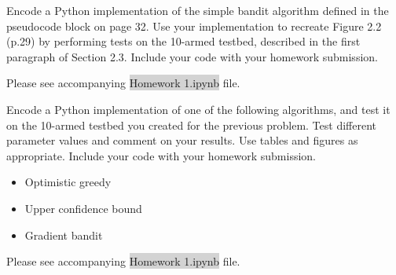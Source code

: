 \documentclass[12pt,letterpaper]{exam}
\newcommand\chapter{1}
\begin{document}
\begin{questions}
	\renewcommand\chapter{ }


	\question%
	Encode a Python implementation of the simple bandit algorithm defined in the pseudocode block on page 32. 
	Use your implementation to recreate Figure 2.2 (p.29) by performing tests on the 10-armed testbed, 
	described in the first paragraph of Section 2.3. Include your code with your homework submission.
	
	\begin{solution}
		Please see accompanying \colorbox{lightgray}{Homework 1.ipynb} file.
	\end{solution}

	\question%
	Encode a Python implementation of one of the following algorithms, and test it on the 10-armed testbed you created for the previous problem. 
	Test different parameter values and comment on your results. 
	Use tables and figures as appropriate. Include your code with your homework submission.
	\begin{itemize}
		\item Optimistic greedy
		\item Upper confidence bound 
		\item Gradient bandit
	\end{itemize}
	
	\begin{solution}
		Please see accompanying \colorbox{lightgray}{Homework 1.ipynb} file.
	\end{solution}


\end{questions}
\end{document}
